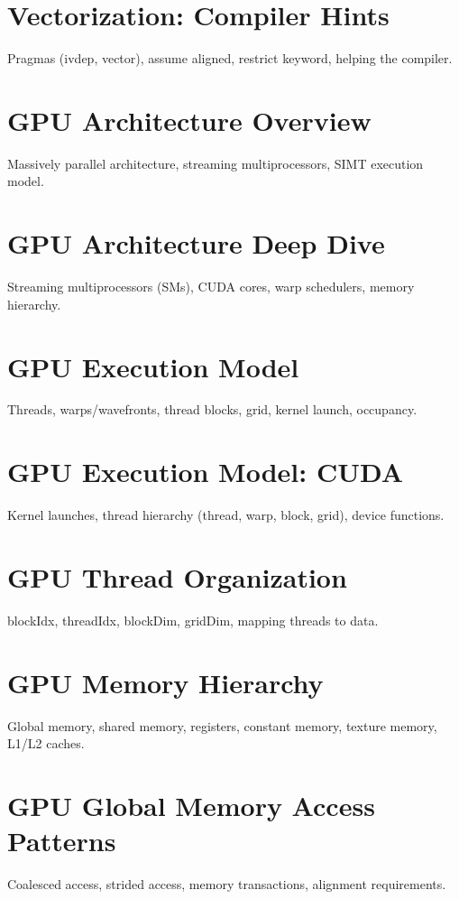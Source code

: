 \chapter{Vectorization: Compiler Hints}
Pragmas (ivdep, vector), assume aligned, restrict keyword, helping the compiler.


\chapter{GPU Architecture Overview}
Massively parallel architecture, streaming multiprocessors, SIMT execution model.

\chapter{GPU Architecture Deep Dive}
Streaming multiprocessors (SMs), CUDA cores, warp schedulers, memory hierarchy.

\chapter{GPU Execution Model}
Threads, warps/wavefronts, thread blocks, grid, kernel launch, occupancy.

\chapter{GPU Execution Model: CUDA}
Kernel launches, thread hierarchy (thread, warp, block, grid), device functions.

\chapter{GPU Thread Organization}
blockIdx, threadIdx, blockDim, gridDim, mapping threads to data.

\chapter{GPU Memory Hierarchy}
Global memory, shared memory, registers, constant memory, texture memory, L1/L2 caches.

\chapter{GPU Global Memory Access Patterns}
Coalesced access, strided access, memory transactions, alignment requirements.

